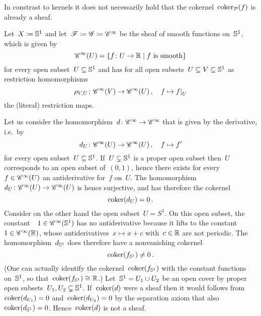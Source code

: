 \begin{example}
\begin{enumerate}
      In constrast to kernels it does not necessarily hold that the cokernel~$\operatorname{coker}_{\mathcal{P}}(f)$ is already a sheaf.
      
      \begin{examplenonum}
        Let~$X \coloneqq \mathbb{S}^1$ and let~$\mathscr{F} \coloneqq \mathscr{G} \coloneqq \mathscr{C}^\infty$ be the sheaf of smooth  functions on~$\mathbb{S}^1$, which is given by
        \[
            \sheaf{C}^\infty(U)
          = \{
              f \colon U \to \Real
            \suchthat
              \text{$f$ is smooth}
            \}
        \]
        for every open subset~$U \subseteq \mathbb{S}^1$ and has for all open subsets~$U \subseteq V \subseteq \mathbb{S}^1$ as restriction homomorphisms
        \[
                  \rho_{V,U}
          \colon  \sheaf{C}^\infty(V)
          \to     \sheaf{C}^\infty(U) \,,
          \quad   f
          \mapsto \restrict{f}{U}
        \]
        the (literal) restriction maps.

        Let us consider the homomorphism~$d \colon \mathscr{C}^\infty \to \mathscr{C}^\infty$ that is given by the derivative, i.e.\ by
        \[
                  d_U
          \colon  \mathscr{C}^\infty(U)
          \to     \mathscr{C}^\infty(U) \,,
          \quad   f
          \mapsto f'
        \]
        for every open subset~$U \subseteq \mathbb{S}^1$.
        If~$U \subsetneq \mathbb{S}^1$ is a proper open subset then~$U$ corresponds to an open subset of~$(0,1)$, hence there exists for every~$f \in \mathscr{C}^\infty(U)$ an antiderivative for~$f$ on~$U$.
        The homomorphism~$d_U \colon \mathscr{C}^\infty(U) \to \mathscr{C}^\infty(U)$ is hence surjective, and has therefore the cokernel
        \[
            \operatorname{coker}(d_U)
          = 0 \,.
        \]
        Consider on the other hand the open subset~$U = S^1$.
        On this open subset, the constant~~$1 \in \mathscr{C}^\infty(\mathbb{S}^1)$ has no antiderivative because it lifts to the constant~~$1 \in \mathscr{C}^\infty(\mathbb{R})$, whose antiderivatives~$x \mapsto x + c$ with~$c \in \mathbb{R}$ are not periodic.
        The homomorphism~$d_{\mathbb{S}^1}$ does therefore have a nonvanishing cokernel
        \[
                \operatorname{coker}(f_{\mathbb{S}^1})
          \neq  0 \,.
        \]
        (One can actually identify the cokernel~$\operatorname{coker}(f_{\mathbb{S}^1})$ with the constant functions on~$\mathbb{S}^1$, so that~$\operatorname{coker}(f_{\mathbb{S}^1}) \cong \mathbb{R}$.)
        Let~$\mathbb{S}^1 = U_1 \cup U_2$ be an open cover by proper open subsets~$U_1, U_2 \subsetneq \mathbb{S}^1$.
        If~$\operatorname{coker}(d)$ were a sheaf then it would follows from~$\operatorname{coker}(d_{U_1}) = 0$ and~$\operatorname{coker}(d_{U_2}) = 0$ by the separation axiom that also~$\operatorname{coker}(d_{\mathbb{S}^1}) = 0$.
        Hence~$\operatorname{coker}(d)$ is not a sheaf.
      \end{examplenonum}
      

\end{enumerate}
\end{example}
